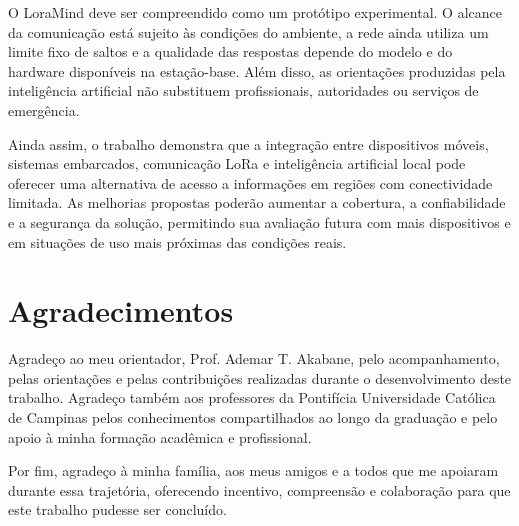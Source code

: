 \documentclass[12pt]{article}
\begin{document}
O LoraMind deve ser compreendido como um protótipo experimental. O alcance da comunicação está sujeito às condições do ambiente, a rede ainda utiliza um limite fixo de saltos e a qualidade das respostas depende do modelo e do hardware disponíveis na estação-base. Além disso, as orientações produzidas pela inteligência artificial não substituem profissionais, autoridades ou serviços de emergência.

Ainda assim, o trabalho demonstra que a integração entre dispositivos móveis, sistemas embarcados, comunicação LoRa e inteligência artificial local pode oferecer uma alternativa de acesso a informações em regiões com conectividade limitada. As melhorias propostas poderão aumentar a cobertura, a confiabilidade e a segurança da solução, permitindo sua avaliação futura com mais dispositivos e em situações de uso mais próximas das condições reais.

\section{Agradecimentos}

Agradeço ao meu orientador, Prof. Ademar T. Akabane, pelo acompanhamento, pelas orientações e pelas contribuições realizadas durante o desenvolvimento deste trabalho. Agradeço também aos professores da Pontifícia Universidade Católica de Campinas pelos conhecimentos compartilhados ao longo da graduação e pelo apoio à minha formação acadêmica e profissional.

Por fim, agradeço à minha família, aos meus amigos e a todos que me apoiaram durante essa trajetória, oferecendo incentivo, compreensão e colaboração para que este trabalho pudesse ser concluído.



\end{document}
